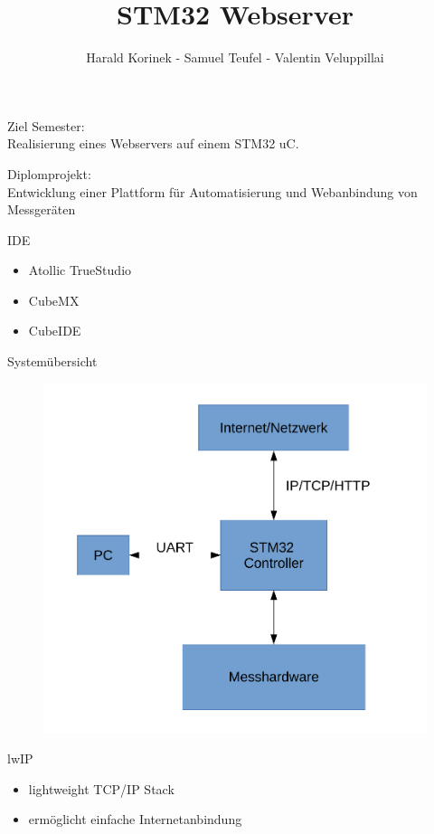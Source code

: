 \documentclass[17pt]{beamer}
\title{STM32 Webserver}
\author{Harald Korinek - Samuel Teufel - Valentin Veluppillai}
\date{}
\begin{document}
\frame{\titlepage}

\begin{frame}[t]{Ziel}
  Semester:\\
  Realisierung eines Webservers auf einem STM32 uC.


  Diplomprojekt:\\
  Entwicklung einer Plattform für Automatisierung und Webanbindung von Messgeräten
\end{frame}

\begin{frame}[t]{IDE}
  \vspace{25pt}
  \begin{itemize}
    \item Atollic TrueStudio
    \item CubeMX
    \item CubeIDE
  \end{itemize}
\end{frame}

\begin{frame}[t]{Systemübersicht}
  \centering
  \begin{figure}
    \includegraphics[height=0.8\textheight]{images/block_schematic}
  \end{figure}
\end{frame}

\begin{frame}[t]{lwIP}
  \vspace{2cm}
  \begin{itemize}
    \item lightweight TCP/IP Stack
    \item ermöglicht einfache Internetanbindung
  \end{itemize}
\end{frame}
\end{document}
